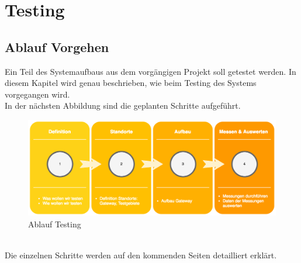 \documentclass[11pt,english,german]{report}
\theoremstyle{definition}
\begin{document}
\chapter{Testing}
\section{Ablauf Vorgehen}
Ein Teil des Systemaufbaus aus dem vorgängigen Projekt soll getestet werden. In diesem Kapitel wird genau beschrieben, wie beim Testing des Systems vorgegangen wird.\\[0.3cm]
In der nächsten Abbildung sind die geplanten Schritte aufgeführt.
\begin{figure}[h]
	\centering
	\includegraphics[width=\textwidth]{img/projectFlow_testing.png}
	\caption[Flowchart Testing]
	{Ablauf Testing}
\end{figure}
\\ 
Die einzelnen Schritte werden auf den kommenden Seiten detailliert erklärt.
\newpage
\end{document}
